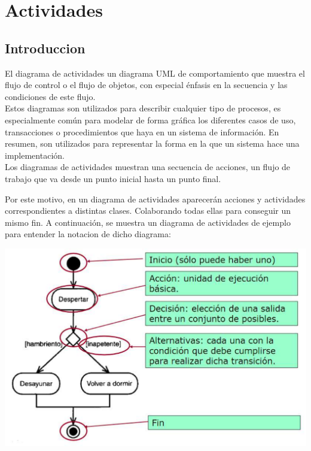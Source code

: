 \chapter{Actividades}
\section{Introduccion}
\begin{flushleft}
	El diagrama de actividades un diagrama UML de comportamiento que muestra el flujo de control o el flujo de objetos, con especial énfasis en la secuencia y las condiciones de este flujo.
		\\
	Estos diagramas son utilizados para describir cualquier tipo de procesos, es especialmente común para modelar de forma gráfica los diferentes casos de uso, transacciones o procedimientos que haya en un sistema de información. En resumen, son utilizados para representar la forma en la que un sistema hace una implementación.
		\\
	Los diagramas de actividades muestran una secuencia de acciones, un flujo de trabajo que va desde un punto inicial hasta un punto final.
	\\
	
	
	
	
\end{flushleft}
	


\newpage
\begin{flushleft}
Por este motivo, en un diagrama de actividades aparecerán acciones y actividades correspondientes a distintas clases. Colaborando todas ellas para conseguir un mismo fin. A continuación, se muestra un diagrama de actividades de ejemplo para entender la notacion de dicho diagrama:
\begin{center}
	{\includegraphics[width=1\linewidth]{imgs/DiagramaActividades-Algoritmo/EjemploDiagramaActividades}}
\end{center}
\end{flushleft}
\newpage
